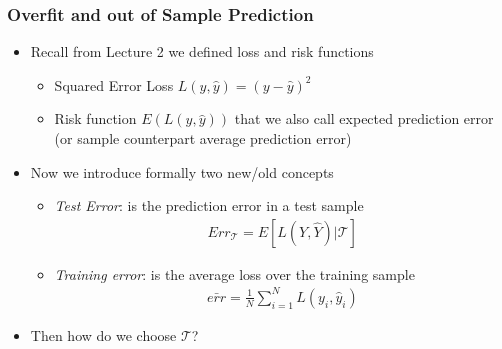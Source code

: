 \documentclass[
  shownotes,
  xcolor={svgnames},
  hyperref={colorlinks,citecolor=DarkBlue,linkcolor=DarkRed,urlcolor=DarkBlue}
  ]{beamer}
\begin{document}
\begin{frame}[fragile]
\frametitle{Overfit and out of Sample Prediction}

\begin{itemize}
\item Recall from Lecture 2 we defined loss and risk functions
\begin{itemize}
  \item Squared Error Loss $L(y,\hat y) =(y-\hat y)^2$
  \item Risk function $E(L(y,\hat y))$ that we also call expected prediction error (or sample counterpart average prediction error)

\end{itemize}
\item Now we introduce formally two new/old concepts
\begin{itemize}
  \item {\it Test Error}: is the prediction error in a test sample
  \begin{align}
    Err_{\mathcal{T}} =E[L(Y,\hat Y)|\mathcal{T}]
  \end{align}
  \item {\it Training error}: is the average loss over the training sample
  \begin{align}
    \bar{err} = \frac{1}{N} \sum_{i=1}^N L(y_i,\hat y_i)
  \end{align}
\end{itemize}
  \item Then how do we choose $\mathcal{T}$?
\end{itemize}



\end{frame}
\end{document}
